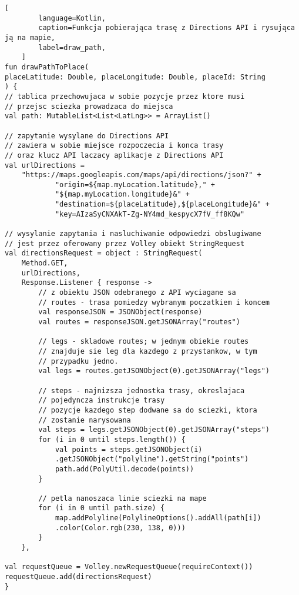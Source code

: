 \newpage
    \begin{lstlisting}[
        language=Kotlin, 
        caption=Funkcja pobierająca trasę z Directions API i rysująca ją na mapie, 
        label=draw_path,
    ]
fun drawPathToPlace(
placeLatitude: Double, placeLongitude: Double, placeId: String
) {
// tablica przechowujaca w sobie pozycje przez ktore musi 
// przejsc sciezka prowadzaca do miejsca
val path: MutableList<List<LatLng>> = ArrayList()

// zapytanie wysylane do Directions API
// zawiera w sobie miejsce rozpoczecia i konca trasy
// oraz klucz API laczacy aplikacje z Directions API
val urlDirections =
    "https://maps.googleapis.com/maps/api/directions/json?" +
            "origin=${map.myLocation.latitude}," +
            "${map.myLocation.longitude}&" +
            "destination=${placeLatitude},${placeLongitude}&" +
            "key=AIzaSyCNXAkT-Zg-NY4md_kespycX7fV_ff8KQw"

// wysylanie zapytania i nasluchiwanie odpowiedzi obslugiwane 
// jest przez oferowany przez Volley obiekt StringRequest
val directionsRequest = object : StringRequest(
    Method.GET,
    urlDirections,
    Response.Listener { response ->
        // z obiektu JSON odebranego z API wyciagane sa
        // routes - trasa pomiedzy wybranym poczatkiem i koncem
        val responseJSON = JSONObject(response)
        val routes = responseJSON.getJSONArray("routes")

        // legs - skladowe routes; w jednym obiekie routes
        // znajduje sie leg dla kazdego z przystankow, w tym
        // przypadku jedno.
        val legs = routes.getJSONObject(0).getJSONArray("legs")

        // steps - najnizsza jednostka trasy, okreslajaca  
        // pojedyncza instrukcje trasy
        // pozycje kazdego step dodwane sa do sciezki, ktora 
        // zostanie narysowana
        val steps = legs.getJSONObject(0).getJSONArray("steps")
        for (i in 0 until steps.length()) {
            val points = steps.getJSONObject(i)
            .getJSONObject("polyline").getString("points")
            path.add(PolyUtil.decode(points))
        }

        // petla nanoszaca linie sciezki na mape
        for (i in 0 until path.size) {
            map.addPolyline(PolylineOptions().addAll(path[i])
            .color(Color.rgb(230, 138, 0)))
        }
    },

val requestQueue = Volley.newRequestQueue(requireContext())
requestQueue.add(directionsRequest)
}
    \end{lstlisting}
    \vspace{1cm}